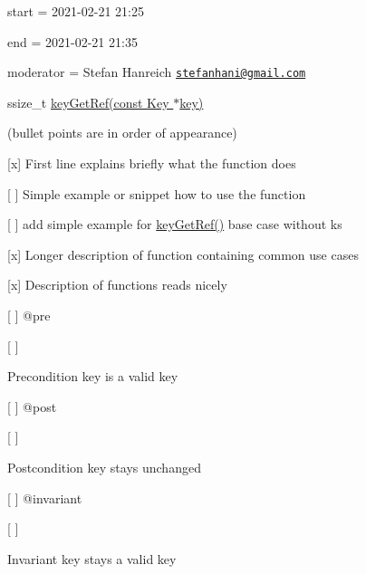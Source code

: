 
\begin{DoxyItemize}
\item start = 2021-\/02-\/21 21\+:25
\item end = 2021-\/02-\/21 21\+:35
\item moderator = Stefan Hanreich \href{mailto:stefanhani@gmail.com}{\tt stefanhani@gmail.\+com}
\end{DoxyItemize}

{\ttfamily ssize\+\_\+t \hyperlink{group__key_ga4aabc4272506dd63161db2bbb42de8ae}{key\+Get\+Ref(const Key $\ast$key)}}

(bullet points are in order of appearance)


\begin{DoxyItemize}
\item \mbox{[}x\mbox{]} First line explains briefly what the function does
\item \mbox{[} \mbox{]} Simple example or snippet how to use the function
\begin{DoxyItemize}
\item \mbox{[} \mbox{]} add simple example for {\ttfamily \hyperlink{group__key_ga4aabc4272506dd63161db2bbb42de8ae}{key\+Get\+Ref()}} base case without ks
\end{DoxyItemize}
\item \mbox{[}x\mbox{]} Longer description of function containing common use cases
\item \mbox{[}x\mbox{]} Description of functions reads nicely
\item \mbox{[} \mbox{]} {\ttfamily @pre}
\begin{DoxyItemize}
\item \mbox{[} \mbox{]} \begin{DoxyPrecond}{Precondition}
key is a valid key
\end{DoxyPrecond}

\end{DoxyItemize}
\item \mbox{[} \mbox{]} {\ttfamily @post}
\begin{DoxyItemize}
\item \mbox{[} \mbox{]} \begin{DoxyPostcond}{Postcondition}
key stays unchanged
\end{DoxyPostcond}

\end{DoxyItemize}
\item \mbox{[} \mbox{]} {\ttfamily @invariant}
\begin{DoxyItemize}
\item \mbox{[} \mbox{]} \begin{DoxyInvariant}{Invariant}
key stays a valid key
\end{DoxyInvariant}


\end{DoxyItemize}
\end{DoxyItemize}
